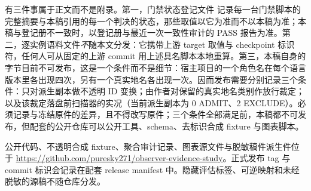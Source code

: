 \documentclass[UTF8,11pt]{ctexart}
\begin{document}
有三件事属于正文而不是附录。第一，门禁状态登记文件  记录每一台门禁脚本的完整摘要与本稿引用的每一个判决的状态，那些取值以它为准而不以本稿为准；本稿与登记册不一致时，以登记册与最近一次一致性审计的 PASS 报告为准。第二，逐实例语料文件\emph{不}随本文分发：它携带上游 target 取值与 checkpoint 标识符，任何人可从固定的上游 commit 用上述具名脚本本地重算。第三，本稿自身的字节目前不可发布，这是一个条件而不是细节：宿主项目的一个角色名在每个语言版本里各出现四次，另有一个真实地名各出现一次。因而发布需要分别记录三个条件：只对派生副本做不透明 ID 变换；由作者对保留的真实地名类别作放行裁定；以及该裁定落盘前扫描器的实况（当前派生副本为 0 ADMIT、2 EXCLUDE）。必须记录与冻结原件的差异，且不得改写原件；三个条件全部满足前，本稿都不可发布，但配套的公开仓库可以公开工具、schema、去标识合成 fixture 与图表脚本。

公开代码、不透明合成 fixture、聚合审计记录、图表源文件与脱敏稿件派生件位于 \url{https://github.com/puresky271/observer-evidence-study}。正式发布 tag 与 commit 标识会记录在配套 release manifest 中。隐藏评估标签、可逆映射和未经脱敏的源稿不随仓库分发。
\end{document}

